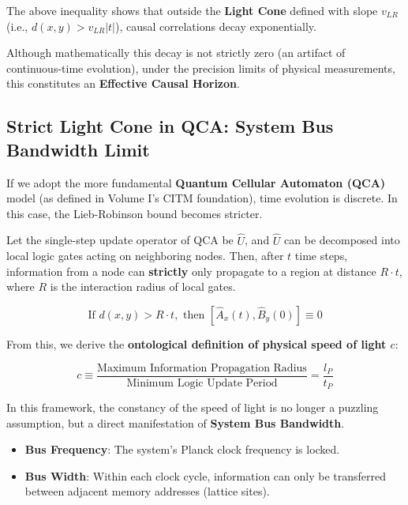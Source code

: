 The above inequality shows that outside the \textbf{Light Cone} defined with slope $v_{LR}$ (i.e., $d(x,y) > v_{LR}|t|$), causal correlations decay exponentially.

Although mathematically this decay is not strictly zero (an artifact of continuous-time evolution), under the precision limits of physical measurements, this constitutes an \textbf{Effective Causal Horizon}.

\subsection{Strict Light Cone in QCA: System Bus Bandwidth Limit}

If we adopt the more fundamental \textbf{Quantum Cellular Automaton (QCA)} model (as defined in Volume I's CITM foundation), time evolution is discrete. In this case, the Lieb-Robinson bound becomes stricter.

Let the single-step update operator of QCA be $\hat{U}$, and $\hat{U}$ can be decomposed into local logic gates acting on neighboring nodes. Then, after $t$ time steps, information from a node can \textbf{strictly} only propagate to a region at distance $R \cdot t$, where $R$ is the interaction radius of local gates.

\begin{equation}
\text{If } d(x,y) > R \cdot t, \text{ then } [\hat{A}_x(t), \hat{B}_y(0)] \equiv 0
\end{equation}

From this, we derive the \textbf{ontological definition of physical speed of light $c$}:

\begin{equation}
c \equiv \frac{\text{Maximum Information Propagation Radius}}{\text{Minimum Logic Update Period}} = \frac{l_P}{t_P}
\end{equation}

In this framework, the constancy of the speed of light is no longer a puzzling assumption, but a direct manifestation of \textbf{System Bus Bandwidth}.

\begin{itemize}
\item \textbf{Bus Frequency}: The system's Planck clock frequency is locked.

\item \textbf{Bus Width}: Within each clock cycle, information can only be transferred between adjacent memory addresses (lattice sites).
\end{itemize}

